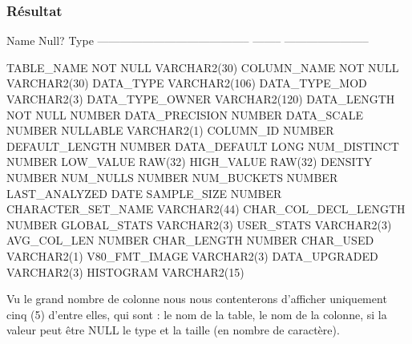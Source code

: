 \documentclass[•]{article}
\begin{document}
\subsubsection{Résultat}
\begin{sql}
 Name                                      Null?    Type
 ----------------------------------------- -------- -----------------------

 TABLE_NAME                                NOT NULL VARCHAR2(30)
 COLUMN_NAME                               NOT NULL VARCHAR2(30)
 DATA_TYPE                                          VARCHAR2(106)
 DATA_TYPE_MOD                                      VARCHAR2(3)
 DATA_TYPE_OWNER                                    VARCHAR2(120)
 DATA_LENGTH                               NOT NULL NUMBER
 DATA_PRECISION                                     NUMBER
 DATA_SCALE                                         NUMBER
 NULLABLE                                           VARCHAR2(1)
 COLUMN_ID                                          NUMBER
 DEFAULT_LENGTH                                     NUMBER
 DATA_DEFAULT                                       LONG
 NUM_DISTINCT                                       NUMBER
 LOW_VALUE                                          RAW(32)
 HIGH_VALUE                                         RAW(32)
 DENSITY                                            NUMBER
 NUM_NULLS                                          NUMBER
 NUM_BUCKETS                                        NUMBER
 LAST_ANALYZED                                      DATE
 SAMPLE_SIZE                                        NUMBER
 CHARACTER_SET_NAME                                 VARCHAR2(44)
 CHAR_COL_DECL_LENGTH                               NUMBER
 GLOBAL_STATS                                       VARCHAR2(3)
 USER_STATS                                         VARCHAR2(3)
 AVG_COL_LEN                                        NUMBER
 CHAR_LENGTH                                        NUMBER
 CHAR_USED                                          VARCHAR2(1)
 V80_FMT_IMAGE                                      VARCHAR2(3)
 DATA_UPGRADED                                      VARCHAR2(3)
 HISTOGRAM                                          VARCHAR2(15)
\end{sql}


Vu le grand nombre de colonne nous nous contenterons d'afficher uniquement cinq (5) d'entre elles, qui sont : le nom de la table, le nom de la colonne, si la valeur peut être NULL le type et la taille (en nombre de caractère).
\end{document}
